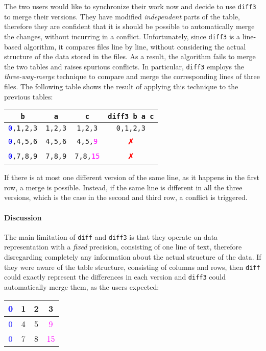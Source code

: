 \documentclass{sigplanconf}
\theoremstyle{plain}
\begin{document}
The two users would like to synchronize their work now and decide to
use \texttt{diff3} to merge their versions.
%
They have modified \emph{independent} parts of the table, therefore
they are confident that it is should be possible to automatically
merge the changes, without incurring in a conflict.
%
Unfortunately, since \texttt{diff3} is a line-based algorithm, it
compares files line by line, without considering the actual structure
of the data stored in the files. 
%
As a result, the algorithm fails to merge the two tables and raises
spurious conflicts.
%
In particular, \texttt{diff3} employs the \emph{three-way-merge}
technique to compare and merge the corresponding lines of three files.
%
The following table shows the result of applying this technique to the
previous tables:
\begin{center}
\begin{tabular}{| c | c | c | c |}
\hline
\texttt{b} & \texttt{a} & \texttt{c} & \texttt{diff3 b a c} \\ \hline
\texttt{\textcolor{blue}{0},1,2,3} & \texttt{1,2,3} & \texttt{1,2,3} & \textcolor{dgreen}{\texttt{0,1,2,3}} \\ \hline
\texttt{\textcolor{blue}{0},4,5,6} & \texttt{4,5,6} & \texttt{4,5,\textcolor{magenta}{9}} & \textcolor{red}{✗}  \\ \hline
\texttt{\textcolor{blue}{0},7,8,9} & \texttt{7,8,9} & \texttt{7,8,\textcolor{magenta}{15}} & \textcolor{red}{✗} \\ \hline
\end{tabular}
\end{center}
If there is at most one different version of the same line, as it
happens in the first row, a merge is possible.
%
Instead, if the same line is different in all the three versions,
which is the case in the second and third row, a conflict is
triggered.
%


\paragraph{Discussion}
The main limitation of \texttt{diff} and \texttt{diff3} is that they
operate on data representation with a \emph{fixed} precision,
consisting of one line of text, therefore disregarding completely any
information about the actual structure of the data.
%
If they were aware of the table structure, consisting of columns and
rows, then \texttt{diff} could exactly represent the differences in
each version and \texttt{diff3} could automatically merge them, as the
users expected:
\begin{center}
\begin{tabular}{| c | c | c | c |}
\hline
\textcolor{blue}{0} & 1 & 2 & 3 \\ \hline
\textcolor{blue}{0} & 4 & 5 & \textcolor{magenta}{9} \\ \hline
\textcolor{blue}{0} & 7 & 8 & \textcolor{magenta}{15} \\ \hline
\end{tabular}
\end{center}
\end{document}
